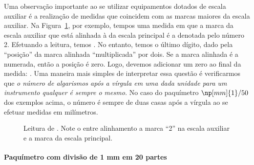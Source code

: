 Uma observação importante ao se utilizar equipamentos dotados de escala auxiliar é a realização de medidas que coincidem com as marcas maiores da escala auxiliar. Na Figura~\ref{Fig:PaquimetroLeituraZero}, por exemplo, tempos uma medida em que a marca da escala auxiliar que está alinhada à da escala principal é a denotada pelo número 2. Efetuando a leitura, temos . No entanto, temos o último dígito, dado pela ``posição'' da marca alinhada ``multiplicada'' por dois. Se a marca alinhada é a numerada, então a posição é zero. Logo, devemos adicionar um zero ao final da medida: . Uma maneira mais simples de interpretar essa questão é verificarmos que \emph{o número de algarismos após a vírgula em uma dada unidade para um instrumento qualquer é sempre o mesmo.} No caso do paquímetro $\np[mm]{1}/50$ dos exemplos acima, o número é sempre de duas casas após a vírgula ao se efetuar medidas em milímetros.
\begin{figure}
\centering
{}
\caption{Leitura de . Note o entre alinhamento a  marca ``2'' na escala auxiliar e a marca da escala principal.\label{Fig:PaquimetroLeituraZero}}
\end{figure}

\paragraph{Paquímetro com divisão de 1 mm em 20 partes}

